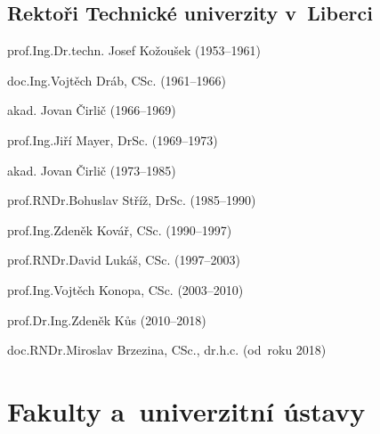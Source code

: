 \documentclass[a4paper,12pt,fonts]{./tulpackage/tularticle}
\begin{document}
\clearpage

\subsection{Rektoři Technické univerzity v~Liberci}

\begin{itemize*}
  \setlength{\itemsep}{-4pt}
  \item prof.\thinspace{}Ing.\thinspace{}Dr.\thinspace{}techn. Josef Kožoušek (1953--1961) %
  \item doc.\thinspace{}Ing.\thinspace{}Vojtěch Dráb, CSc. (1961--1966) %
  \item akad. Jovan Čirlič (1966--1969)
  \item prof.\thinspace{}Ing.\thinspace{}Jiří Mayer, DrSc. (1969--1973) %
  \item akad. Jovan Čirlič (1973--1985)
  \item prof.\thinspace{}RNDr.\thinspace{}Bohuslav Stříž, DrSc. (1985--1990) %
  \item prof.\thinspace{}Ing.\thinspace{}Zdeněk Kovář, CSc. (1990--1997) %
  \item prof.\thinspace{}RNDr.\thinspace{}David Lukáš, CSc. (1997--2003) %
  \item prof.\thinspace{}Ing.\thinspace{}Vojtěch Konopa, CSc. (2003--2010) %
  \item prof.\thinspace{}Dr.\thinspace{}Ing.\thinspace{}Zdeněk Kůs (2010--2018) %
  \item doc.\thinspace{}RNDr.\thinspace{}Miroslav Brzezina, CSc., dr.\thinspace{}h.\thinspace{}c. (od~roku 2018)~\cite{golka} %
\end{itemize*}

\clearpage

\section{Fakulty a~univerzitní ústavy}
\end{document}
